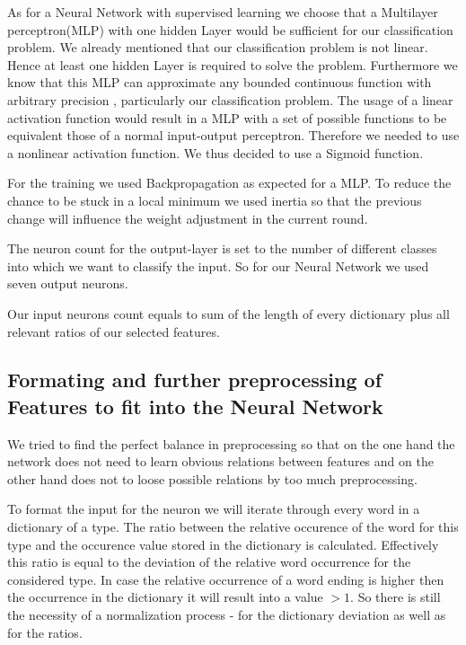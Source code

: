 \documentclass[paper=A4,pagesize=auto,12pt,headinclude=true,footinclude=true,BCOR=0mm,DIV=calc]{scrartcl}
\begin{document}
	As for a Neural Network with supervised learning we choose that a Multilayer perceptron(MLP) with one hidden Layer would be sufficient for our classification problem. We already mentioned that our classification problem is not linear. Hence at least one hidden Layer is required to solve the problem. Furthermore we know that this MLP can approximate any bounded continuous function with arbitrary precision \cite{ApproximateAnyFunction}, particularly our classification problem.
	The usage of a linear activation function would result in a MLP with a set of possible functions to be equivalent those of a normal input-output perceptron. Therefore we needed to use a nonlinear activation function. We thus decided to use a Sigmoid function. 
	
	For the training we used Backpropagation as expected for a MLP. To reduce the chance to be stuck in a local minimum we used inertia so that the previous change will influence the weight adjustment in the current round.
	
	The neuron count for the output-layer is set to the number of different classes into which we want to classify the input. So for our Neural Network we used seven output neurons.
	
	Our input neurons count equals to sum of the length of every dictionary plus all relevant ratios of our selected features.
	
	\subsection{Formating and further preprocessing of Features to fit into the Neural Network}
	We tried to find the perfect balance in preprocessing so that on the one hand the network does not need to learn obvious relations between features and on the other hand does not to loose possible relations by too much preprocessing.
	
	To format the input for the neuron we will iterate through every word in a dictionary of a type. The ratio between the relative occurence of the word for this type and the occurence value stored in the dictionary is calculated. Effectively this ratio is equal to the deviation of the relative word occurrence for the considered type. In case the relative occurrence of a word ending is higher then the occurrence in the dictionary it will result into a value $> 1$. So there is still the necessity of a normalization process - for the dictionary deviation as well as for the ratios.
	
\end{document}
